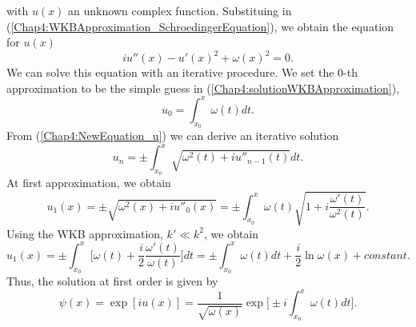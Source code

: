 \documentclass[11pt,a4paper,twoside]{book}
\begin{document}
with  $ u(x) $ an unknown complex function. Substituing in (\ref{Chap4:WKBApproximation_SchroedingerEquation}), we obtain the equation for $ u(x) $
\begin{equation}
	\label{Chap4:NewEquation_u}
	iu''(x) - u'(x)^{2} + \omega(x)^{2} = 0.
\end{equation}
We can solve this equation with an iterative procedure. We set the $ 0 $-th approximation to be the simple guess in (\ref{Chap4:solutionWKBApproximation}),
\begin{equation}
	u_{0}=\int_{x_{0}}^{x} \omega(t) dt.
\end{equation}
From (\ref{Chap4:NewEquation_u}) we can derive an iterative solution
\begin{equation}
u_{n} = \pm \int_{x_{0}}^{x}\sqrt{\omega^{2}(t) + iu''_{n-1}(t)}dt.
\end{equation}
At first approximation, we obtain
\begin{equation}
	\label{Chap4:WKB_u1}
	u_{1}(x) = \pm \sqrt{\omega^{2}(x) + iu''_{0}(x)} = \pm \int_{x_{0}}^{x} \omega(t) \sqrt{1+i\frac{\omega'(t)}{\omega^{2}(t)}}.
\end{equation}
Using the WKB approximation, $ k'\ll k^{2} $, we obtain
\begin{equation}
u_{1}(x)= \pm \int_{x_{0}}^{x} \Bigg[  \omega(t) + \frac{i}{2}\frac{\omega'(t)}{\omega(t)}\Bigg]dt =
 \pm \int_{x_{0}}^{x} \omega(t) dt + \frac{i}{2} \ln \omega(x) + constant.
\end{equation}
Thus, the solution at first order is given by
\begin{equation}
\label{Chap4:Chap4:WKBFinalSolution}
\psi(x)=\exp[iu(x)]=\frac{1}{\sqrt{\omega(x)}}\exp \Bigg[\pm i\int_{x_0}^{x}\omega(t)dt\Bigg].
\end{equation}
\end{document}
